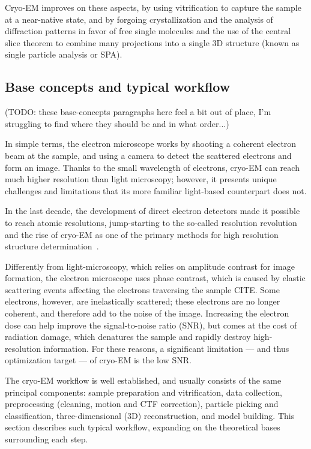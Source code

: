 Cryo-EM improves on these aspects, by using vitrification to capture the sample at a near-native state, and by forgoing crystallization and the analysis of diffraction patterns in favor of free single molecules and the use of the central slice theorem to combine many projections into a single 3D structure (known as single particle analysis or SPA).

\subsection{Base concepts and typical workflow}

(TODO: these base-concepts paragraphs here feel a bit out of place, I'm struggling to find where they should be and in what order...)

In simple terms, the electron microscope works by shooting a coherent electron beam at the sample, and using a camera to detect the scattered electrons and form an image. Thanks to the small wavelength of electrons, cryo-EM can reach much higher resolution than light microscopy; however, it presents unique challenges and limitations that its more familiar light-based counterpart does not.

In the last decade, the development of direct electron detectors made it possible to reach atomic resolutions, jump-starting to the so-called resolution revolution and the rise of cryo-EM as one of the primary methods for high resolution structure determination~\cite{faruqiCCDDetectorsHighresolution2000}.

Differently from light-microscopy, which relies on amplitude contrast for image formation, the electron microscope uses phase contrast, which is caused by elastic scattering events affecting the electrons traversing the sample CITE. Some electrons, however, are inelastically scattered; these electrons are no longer coherent, and therefore add to the noise of the image. Increasing the electron dose can help improve the signal-to-noise ratio (SNR), but comes at the cost of radiation damage, which denatures the sample and rapidly destroy high-resolution information. For these reasons, a significant limitation --- and thus optimization target --- of cryo-EM is the low SNR.

The cryo-EM workflow is well established, and usually consists of the same principal components: sample preparation and vitrification, data collection, preprocessing (cleaning, motion and CTF correction), particle picking and classification, three-dimensional (3D) reconstruction, and model building. This section describes such typical workflow, expanding on the theoretical bases surrounding each step.


